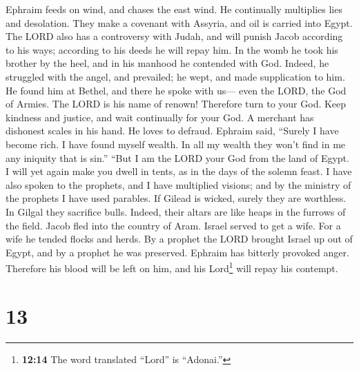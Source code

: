  Ephraim feeds on wind, and chases the east wind. He
continually multiplies lies and desolation. They make a covenant with
Assyria, and oil is carried into Egypt.  The LORD also has
a controversy with Judah, and will punish Jacob according to his ways;
according to his deeds he will repay him.  In the womb he
took his brother by the heel, and in his manhood he contended with God.
 Indeed, he struggled with the angel, and prevailed; he
wept, and made supplication to him. He found him at Bethel, and there he
spoke with us---  even the LORD, the God of Armies. The
LORD is his name of renown!  Therefore turn to your God.
Keep kindness and justice, and wait continually for your God.
 A merchant has dishonest scales in his hand. He loves to
defraud.  Ephraim said, ``Surely I have become rich. I
have found myself wealth. In all my wealth they won't find in me any
iniquity that is sin.''  ``But I am the LORD your God from
the land of Egypt. I will yet again make you dwell in tents, as in the
days of the solemn feast.  I have also spoken to the
prophets, and I have multiplied visions; and by the ministry of the
prophets I have used parables.  If Gilead is wicked,
surely they are worthless. In Gilgal they sacrifice bulls. Indeed, their
altars are like heaps in the furrows of the field.  Jacob
fled into the country of Aram. Israel served to get a wife. For a wife
he tended flocks and herds.  By a prophet the LORD
brought Israel up out of Egypt, and by a prophet he was preserved.
 Ephraim has bitterly provoked anger. Therefore his blood
will be left on him, and his Lord\footnote{\textbf{12:14} The word
  translated ``Lord'' is ``Adonai.''} will repay his contempt.

\hypertarget{section-7}{%
\section{13}\label{section-7}}


